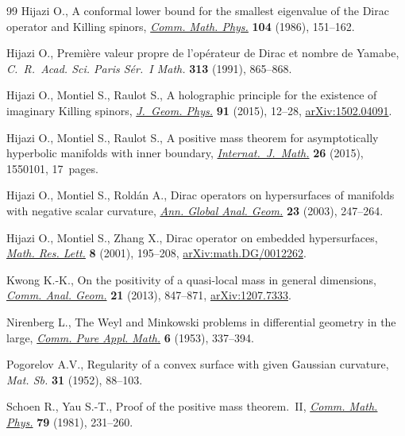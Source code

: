 \begin{thebibliography}{99}
Hijazi O., A conformal lower bound for the smallest eigenvalue of the {D}irac
 operator and {K}illing spinors, \href{https://doi.org/10.1007/BF01210797}{\textit{Comm. Math. Phys.}} \textbf{104}
 (1986), 151--162.

Hijazi O., Premi\`ere valeur propre de l'op\'erateur de {D}irac et nombre de
 {Y}amabe, \textit{C.~R.~Acad. Sci. Paris S\'er.~I Math.} \textbf{313} (1991),
 865--868.

Hijazi O., Montiel S., Raulot S., A holographic principle for the existence of
 imaginary {K}illing spinors, \href{https://doi.org/10.1016/j.geomphys.2015.01.012}{\textit{J.~Geom. Phys.}} \textbf{91} (2015),
 12--28, \href{https://arxiv.org/abs/1502.04091}{arXiv:1502.04091}.

Hijazi O., Montiel S., Raulot S., A positive mass theorem for asymptotically
 hyperbolic manifolds with inner boundary, \href{https://doi.org/10.1142/S0129167X15501013}{\textit{Internat.~J.~Math.}}
 \textbf{26} (2015), 1550101, 17~pages.

Hijazi O., Montiel S., Rold\'an A., Dirac operators on hypersurfaces of
 manifolds with negative scalar curvature, \href{https://doi.org/10.1023/A:1022808916165}{\textit{Ann. Global Anal. Geom.}}
 \textbf{23} (2003), 247--264.

Hijazi O., Montiel S., Zhang X., Dirac operator on embedded hypersurfaces,
 \href{https://doi.org/10.4310/MRL.2001.v8.n2.a8}{\textit{Math. Res. Lett.}} \textbf{8} (2001), 195--208,
 \href{https://arxiv.org/abs/math.DG/0012262}{arXiv:math.DG/0012262}.

Kwong K.-K., On the positivity of a quasi-local mass in general dimensions,
 \href{https://doi.org/10.4310/CAG.2013.v21.n4.a3}{\textit{Comm. Anal. Geom.}} \textbf{21} (2013), 847--871, \href{https://arxiv.org/abs/1207.7333}{arXiv:1207.7333}.

Nirenberg L., The {W}eyl and {M}inkowski problems in differential geometry in
 the large, \href{https://doi.org/10.1002/cpa.3160060303}{\textit{Comm. Pure Appl. Math.}} \textbf{6} (1953), 337--394.

Pogorelov A.V., Regularity of a convex surface with given {G}aussian curvature,
 \textit{Mat. Sb.} \textbf{31} (1952), 88--103.

Schoen R., Yau S.-T., Proof of the positive mass theorem.~{II}, \href{https://doi.org/10.1007/BF01942062}{\textit{Comm.
 Math. Phys.}} \textbf{79} (1981), 231--260.


\end{thebibliography}
